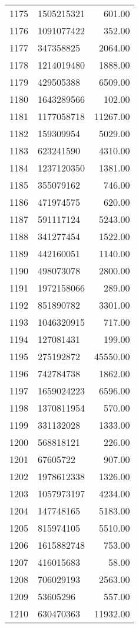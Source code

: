 \begin{table}[ht]
\begin{tabular}{rlr}
  1175 & 1505215321 & 601.00 \\ 
  1176 & 1091077422 & 352.00 \\ 
  1177 & 347358825 & 2064.00 \\ 
  1178 & 1214019480 & 1888.00 \\ 
  1179 & 429505388 & 6509.00 \\ 
  1180 & 1643289566 & 102.00 \\ 
  1181 & 1177058718 & 11267.00 \\ 
  1182 & 159309954 & 5029.00 \\ 
  1183 & 623241590 & 4310.00 \\ 
  1184 & 1237120350 & 1381.00 \\ 
  1185 & 355079162 & 746.00 \\ 
  1186 & 471974575 & 620.00 \\ 
  1187 & 591117124 & 5243.00 \\ 
  1188 & 341277454 & 1522.00 \\ 
  1189 & 442160051 & 1140.00 \\ 
  1190 & 498073078 & 2800.00 \\ 
  1191 & 1972158066 & 289.00 \\ 
  1192 & 851890782 & 3301.00 \\ 
  1193 & 1046320915 & 717.00 \\ 
  1194 & 127081431 & 199.00 \\ 
  1195 & 275192872 & 45550.00 \\ 
  1196 & 742784738 & 1862.00 \\ 
  1197 & 1659024223 & 6596.00 \\ 
  1198 & 1370811954 & 570.00 \\ 
  1199 & 331132028 & 1333.00 \\ 
  1200 & 568818121 & 226.00 \\ 
  1201 & 67605722 & 907.00 \\ 
  1202 & 1978612338 & 1326.00 \\ 
  1203 & 1057973197 & 4234.00 \\ 
  1204 & 147748165 & 5183.00 \\ 
  1205 & 815974105 & 5510.00 \\ 
  1206 & 1615882748 & 753.00 \\ 
  1207 & 416015683 & 58.00 \\ 
  1208 & 706029193 & 2563.00 \\ 
  1209 & 53605296 & 557.00 \\ 
  1210 & 630470363 & 11932.00 \\ 

\end{tabular}
\end{table}
